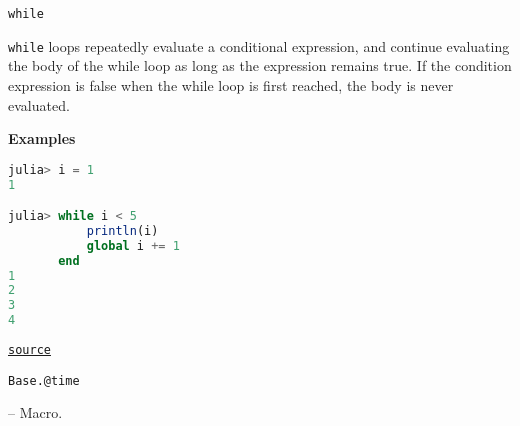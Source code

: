 \begin{adjustwidth}{2em}{0pt}


\begin{lstlisting}[]
while
\end{lstlisting}

\texttt{while} loops repeatedly evaluate a conditional expression, and continue evaluating the body of the while loop as long as the expression remains true. If the condition expression is false when the while loop is first reached, the body is never evaluated.

\textbf{Examples}


\begin{lstlisting}[language=julia, style=jlcodestyle]
julia> i = 1
1

julia> while i < 5
           println(i)
           global i += 1
       end
1
2
3
4
\end{lstlisting}



\href{https://github.com/JuliaLang/julia/blob/8e630552924eac54c809aa7bc30871c7df1582d3/base/docs/basedocs.jl#L928-L949}{\texttt{source}}


\end{adjustwidth}
\hypertarget{16039636267419312856}{\texttt{Base.@time}}  -- {Macro.}

